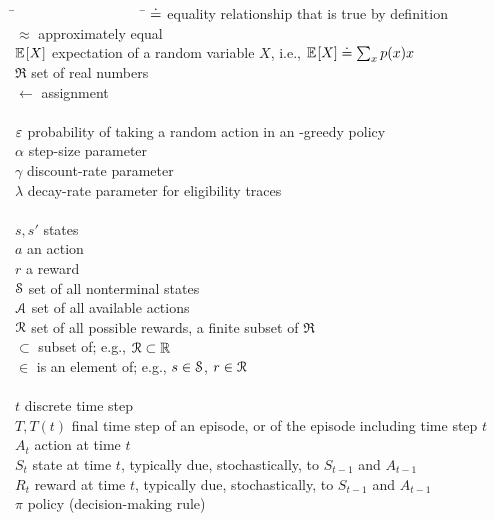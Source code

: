 \documentclass[a4paper, 12pt]{article}
\begin{document}
\begin{tabbing}
    \=~~~~~~~~~~~~~~~~~~  \= \kill
    \>$\defeq$            \> equality relationship that is true by definition\\
    \>$\approx$           \> approximately equal\\
    \>$\E{X}$             \> expectation of a random variable $X$, i.e., $\E{X}\defeq\sum_x p(x)x$\\
    \>$\Re$               \> set of real numbers\\
    \>$\leftarrow$        \> assignment\\
    \\
    \>$\e$                \> probability of taking a random action in an \e-greedy policy\\
    \>$\alpha$            \> step-size parameter\\
    \>$\gamma$            \> discount-rate parameter\\
    \>$\lambda$           \> decay-rate parameter for eligibility traces\\
    \\
    \>$s, s'$             \> states\\
    \>$a$                 \> an action\\
    \>$r$                 \> a reward\\
    \>$\S$                \> set of all nonterminal states\\
    \>$\A$                \> set of all available actions\\
    \>$\R$                \> set of all possible rewards, a finite subset of $\Re$\\
    \>$\subset$           \> subset of; e.g., $\R\subset\Re$\\
    \>$\in$               \> is an element of; e.g., $s\in\S$, $r\in\R$\\
    \\
    \>$t$                 \> discrete time step\\
    \>$T, T(t)$           \> final time step of an episode, or of the episode including time step $t$\\
    \>$A_t$               \> action at time $t$\\
    \>$S_t$               \> state at time $t$, typically due, stochastically, to $S_{t-1}$ and $A_{t-1}$\\
    \>$R_t$               \> reward at time $t$, typically due, stochastically, to $S_{t-1}$ and $A_{t-1}$\\
    \>$\pi$               \> policy (decision-making rule)\\

\end{tabbing}
\end{document}
